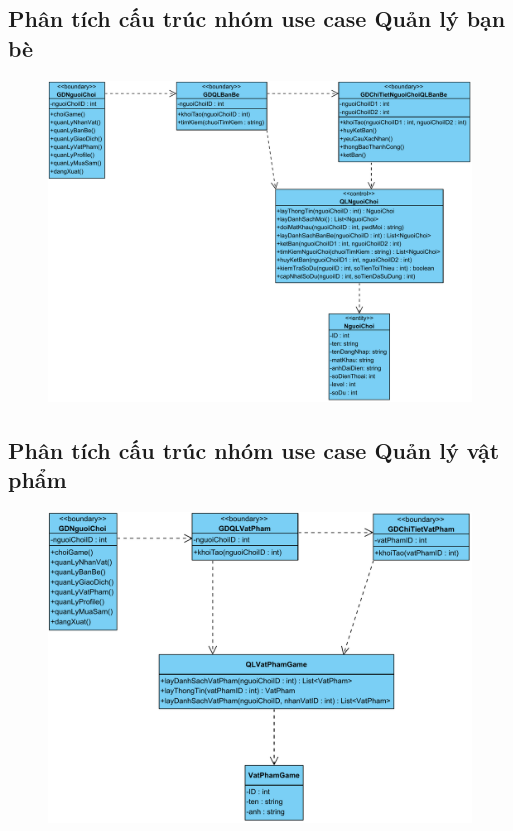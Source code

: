 \documentclass[3p]{elsarticle}
\begin{document}
\subsection{Phân tích cấu trúc nhóm use case Quản lý bạn bè}
\begin{figure}[!htbp]
	\hspace*{-.5in}
	\centering
	\includegraphics[scale=.55]{images/structure-pdfs/gamer/FriendManagement.pdf}
\end{figure}
\newpage
\subsection{Phân tích cấu trúc nhóm use case Quản lý vật phẩm}
\begin{figure}[!htbp]
	\hspace*{-.5in}
	\centering
	\includegraphics[scale=.55]{images/structure-pdfs/gamer/ItemManagement.pdf}
\end{figure}
\newpage
\end{document}
